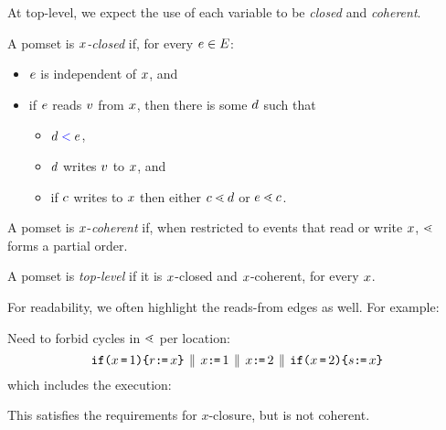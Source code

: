 At top-level, we expect the use of each variable to be \emph{closed} and \emph{coherent}.

\begin{definition}
\label{def:x-closed}
  A pomset is \emph{$x$-closed} if, for every $e\in E$:
  \begin{itemize}
  \item $e$ is independent of $x$, and
  \item if $e$ reads $v$ from $x$, then there is some $d$ such that
  \begin{itemize}
  \item $d \mathrel{{\color{blue}<}} e$,  
  \item $d$ writes $v$ to $x$, and
  \item if $c$ writes to $x$
    then either $c \lessdot d$ or $e \lessdot c$.
  \end{itemize}    
  \end{itemize}

  A pomset is $x$-\emph{coherent} if, when restricted to events that read
  or write $x$, $\lessdot$ forms a partial order.

  A pomset is \emph{top-level} if it is $x$-closed and $x$-coherent,
  for every $x$.
\end{definition}


For readability, we often highlight the reads-from edges as well.
For example:
\begin{tikzdisplay}[node distance=1em]
\end{tikzdisplay}


Need to forbid cycles in $\lessdot$ per location:
\[
  \texttt{if}\allowbreak\texttt{(}x\,\texttt{=}\,1\texttt{)}\allowbreak\texttt{\{} r\texttt{:}\mkern-1mu\texttt{=}\, x \texttt{\}}
  \,\mathbin{\|}\,
  x\texttt{:}\mkern-1mu\texttt{=}\, 1
  \,\mathbin{\|}\,
  x\texttt{:}\mkern-1mu\texttt{=}\,2
  \,\mathbin{\|}\,
  \texttt{if}\allowbreak\texttt{(}x\,\texttt{=}\,2\texttt{)}\allowbreak\texttt{\{} s\texttt{:}\mkern-1mu\texttt{=}\, x \texttt{\}}
\]
which includes the execution:
\begin{tikzdisplay}[node distance=1em]
\end{tikzdisplay}
This satisfies the requirements for $x$-closure, but is not coherent.

